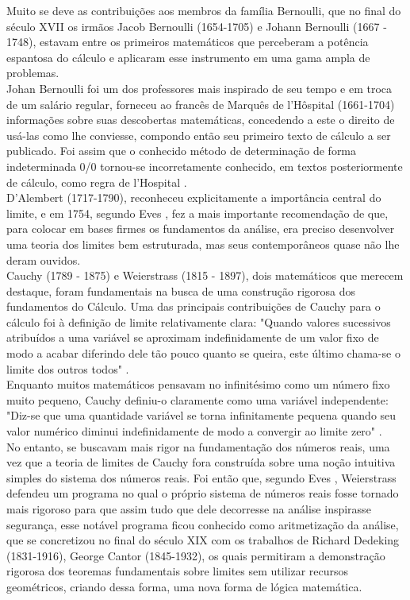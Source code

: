  Muito se deve as
contribuições aos membros da família Bernoulli, que no final do
século XVII os irmãos Jacob Bernoulli (1654-1705) e Johann Bernoulli
(1667 - 1748), estavam entre os primeiros matemáticos que perceberam
a potência espantosa do cálculo e aplicaram esse instrumento em uma
gama ampla de problemas.\\


 Johan Bernoulli foi um dos professores mais
inspirado de seu tempo e em troca de um salário regular, forneceu ao
francês de Marquês de l'Hôspital (1661-1704) informações sobre suas
descobertas matemáticas, concedendo a este o direito de usá-las como
lhe conviesse, compondo então seu primeiro texto de cálculo a ser
publicado. Foi assim que o conhecido método de determinação de forma
indeterminada 0/0 tornou-se incorretamente conhecido, em textos
posteriormente de cálculo, como regra de l'Hospital \cite{eves}.\\


D'Alembert (1717-1790), reconheceu explicitamente a importância
central do limite, e em 1754, segundo Eves \cite{eves}, fez a mais
importante recomendação de que, para colocar em bases firmes os
fundamentos da análise, era preciso desenvolver uma teoria dos
limites bem estruturada, mas seus contemporâneos quase não lhe deram
ouvidos.\\

Cauchy (1789 - 1875) e Weierstrass (1815 - 1897), dois matemáticos
que merecem destaque, foram fundamentais na busca de uma construção
rigorosa dos fundamentos do Cálculo. Uma das principais
contribuições de Cauchy para o cálculo foi à definição de limite
relativamente clara: "Quando valores sucessivos atribuídos a uma
variável se aproximam indefinidamente de um valor fixo de modo a
acabar diferindo dele tão pouco quanto se queira, este último
chama-se o limite dos outros todos" \cite[p.355]{boyer}.\\

 Enquanto muitos
matemáticos pensavam no infinitésimo como um número fixo muito
pequeno, Cauchy definiu-o claramente como uma variável independente:
"Diz-se que uma quantidade variável se torna infinitamente pequena
quando seu valor numérico diminui indefinidamente de modo a
convergir ao limite zero" \cite[p.355]{boyer}. \\



 No entanto, se buscavam
mais rigor na fundamentação dos números reais, uma vez que a teoria
de limites de Cauchy fora construída sobre uma noção intuitiva
simples do sistema dos números reais. Foi então que, segundo Eves \cite{eves}, Weierstrass defendeu um programa no qual o próprio sistema
de números reais fosse tornado mais rigoroso para que assim tudo que
dele decorresse na análise inspirasse segurança, esse notável
programa ficou conhecido como aritmetização da análise, que se
concretizou no final do século XIX com os trabalhos de Richard
Dedeking (1831-1916), George Cantor (1845-1932), os quais permitiram
a demonstração rigorosa dos teoremas fundamentais sobre limites sem
utilizar recursos geométricos, criando dessa forma, uma nova forma
de lógica matemática.\\



